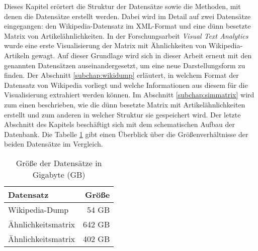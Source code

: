 
Dieses Kapitel erörtert die Struktur der Datensätze sowie die Methoden, mit denen die Datensätze erstellt werden.
Dabei wird im Detail auf zwei Datensätze eingegangen: den Wikipedia-Datensatz im XML-Format und eine dünn besetzte Matrix von Artikelähnlichkeiten.
In der Forschungsarbeit \emph{Visual Text Analytics} wurde eine erste Visualisierung der Matrix mit Ähnlichkeiten von Wikipedia-Artikeln gewagt.
Auf dieser Grundlage wird sich in dieser Arbeit erneut mit den genannten Datensätzen auseinandergesetzt, um eine neue Darstellungsform zu finden.
Der Abschnitt \ref{subchap:wikidump} erläutert, in welchem Format der Datensatz von Wikipedia vorliegt und welche Informationen aus diesem für die Visualisierung extrahiert werden können.
Im Abschnitt \ref{subchap:simmatrix} wird zum einen beschrieben, wie die dünn besetzte Matrix mit Artikelähnlichkeiten erstellt und zum anderen in welcher Struktur sie gespeichert wird.
Der letzte Abschnitt des Kapitels beschäftigt sich mit dem schematischen Aufbau der Datenbank.
Die Tabelle \ref{tab:dataset-size} gibt einen Überblick über die Größenverhältnisse der beiden Datensätze im Vergleich.



\begin{table}[h]
\centering
\begin{tabular}{l r}
  \hline
  Datensatz & Größe \\
  \hline
  Wikipedia-Dump & 54 GB \\
  Ähnlichkeitsmatrix \cite{licht:2017} & 642 GB \\
  Ähnlichkeitsmatrix \cite{riehmann2016visualizing} & 402 GB\\
\end{tabular}
\caption{Größe der Datensätze in Gigabyte (GB)}
\label{tab:dataset-size}
\end{table}



